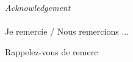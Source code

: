 %
\begin{center}
\huge{\emph{Acknowledgement}}
\end{center}

\vspace{1cm}

\paragraph{}
Je remercie / Nous remercions ...

Rappelez-vous de remerc